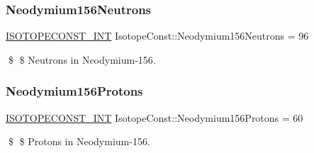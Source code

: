 \subsubsection{\texorpdfstring{Neodymium156\+Neutrons}{Neodymium156Neutrons}}
{\footnotesize\ttfamily \mbox{\hyperlink{group___isotope_const-_macros_ga5f18360b3e99483a35c32d789e62621c}{I\+S\+O\+T\+O\+P\+E\+C\+O\+N\+S\+T\+\_\+\+I\+NT}} Isotope\+Const\+::\+Neodymium156\+Neutrons = 96}

\$ \$ Neutrons in Neodymium-\/156. \mbox{\label{group___isotope_const-_neodymium-_nd156_ga08f1021bbfd00d28d6cbfc27c972a655}} 
\subsubsection{\texorpdfstring{Neodymium156\+Protons}{Neodymium156Protons}}
{\footnotesize\ttfamily \mbox{\hyperlink{group___isotope_const-_macros_ga5f18360b3e99483a35c32d789e62621c}{I\+S\+O\+T\+O\+P\+E\+C\+O\+N\+S\+T\+\_\+\+I\+NT}} Isotope\+Const\+::\+Neodymium156\+Protons = 60}

\$ \$ Protons in Neodymium-\/156. 